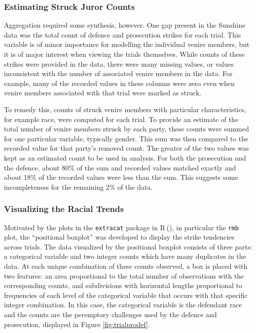 \documentclass[12pt]{article}
\newcommand*{\R}{\textsf{R}$~$}
\begin{document}
\subsubsection{Estimating Struck Juror Counts} \label{subsec:struckjur}

Aggregation required some synthesis, however. One gap present in the Sunshine data was the total count of defence and prosecution strikes for each trial. This variable is of minor importance for modelling the individual venire members, but it is of major interest when viewing the trials themselves. While counts of these strikes were provided in the data, there were many missing values, or values inconsistent with the number of associated venire members in the data. For example, many of the recorded values in these columns were zero even when venire members associated with that trial were marked as struck.

To remedy this,  counts of struck venire members with particular characteristics, for example race, were computed for each trial. To provide an estimate of the total number of venire members struck by each party, these counts were summed for one particular variable, typically gender. This sum was then compared to the recorded value for that party's removed count. The greater of the two values was kept as an estimated count to be used in analysis. For both the prosecution and the defence, about 80\% of the sum and recorded values matched exactly and about 18\% of the recorded values were less than the sum. This suggests some incompleteness for the remaining 2\% of the data.

\subsubsection{Visualizing the Racial Trends} \label{subsec:vistrend}

Motivated by the plots in the \texttt{extracat} package in \R (\cite{extracat}), in particular the \texttt{rmb} plot, the ``positional boxplot'' was developed to display the strike tendencies across trials. The data visualized by the positional boxplot consists of three parts: a categorical variable and two integer counts which have many duplicates in the data. At each unique combination of these counts observed, a box is placed with two features: an area proportional to the total number of observations with the corresponding counts, and subdivisions with horizontal lengths proportional to frequencies of each level of the categorical variable that occurs with that specific integer combination. In this case, the categorical variable is the defendant race and the counts are the peremptory challenges used by the defence and prosecution, displayed in Figure \ref{fig:trialprodef}.
\end{document}
